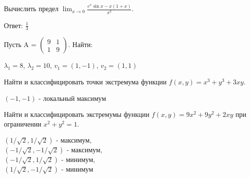 \documentclass[addpoints, answers]{exam} %
\begin{document}
\begin{questions}
\question Вычислить предел $\lim_{x\to 0} \frac{e^x \sin x-x(1+x)}{x^3}$.\\

\begin{solution}
Ответ: $\frac{1}{3}$
\end{solution}

\question Пусть A =
$\left(\begin{array}{cc}
9 & 1\\
1 & 9
\end{array}\right)$. Найти:

\begin{solution}
 $\lambda_{1}=8$, $\lambda_{2}=10$, $v_{1}=(1,-1)$, $v_{2}=(1,1)$
 \end{solution}
 
\question Найти и классифицировать точки экстремума функции $f(x,y)=x^3+y^3+3xy$.\\

\begin{solution}
 $(-1,-1)$ - локальный максимум
\end{solution}

\question Найти и классифицировать экстремумы функции $f(x,y)=9x^2+9y^2+2xy$ при ограничении 
$x^2+y^2=1$.\\

\begin{solution}
 $(1/\sqrt{2},1/\sqrt{2})$ - максимум,\\
 $(-1/\sqrt{2},-1/\sqrt{2})$ - максимум,\\
 $(-1/\sqrt{2},1/\sqrt{2})$ - минимум,\\
 $(1/\sqrt{2},-1/\sqrt{2})$ - минимум
\end{solution}


\end{questions}
\end{document}
